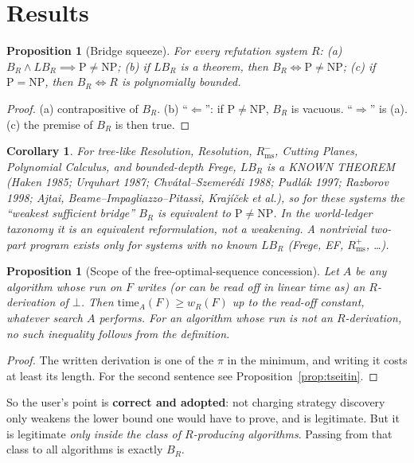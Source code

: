 \documentclass[11pt]{article}
\newtheorem{proposition}[theorem]{Proposition}
\newtheorem{corollary}[theorem]{Corollary}
\begin{document}
\section{Results}
\begin{proposition}[Bridge squeeze]\label{prop:squeeze}
For every refutation system $R$:
(a) $B_R\wedge LB_R\implies \mathrm P\ne\mathrm{NP}$;
(b) if $LB_R$ is a theorem, then $B_R\iff \mathrm P\ne\mathrm{NP}$;
(c) if $\mathrm P=\mathrm{NP}$, then $B_R\iff R$ is polynomially bounded.
\end{proposition}
\begin{proof}
(a) contrapositive of $B_R$. (b) ``$\Leftarrow$'': if $\mathrm P\neq\mathrm{NP}$, $B_R$ is vacuous.
``$\Rightarrow$'' is (a). (c) the premise of $B_R$ is then true.
\end{proof}
\begin{corollary}
For tree-like Resolution, Resolution, $R_{\mathrm{ms}}^{-}$, Cutting Planes, Polynomial Calculus,
and bounded-depth Frege, $LB_R$ is a KNOWN THEOREM (Haken 1985; Urquhart 1987; Chv\'atal--Szemer\'edi 1988;
Pudl\'ak 1997; Razborov 1998; Ajtai, Beame--Impagliazzo--Pitassi, Kraj\'i\v{c}ek et al.),
so for these systems the ``weakest sufficient bridge'' $B_R$ is \emph{equivalent to} $\mathrm P\neq\mathrm{NP}$.
In the world-ledger taxonomy it is an equivalent reformulation, not a weakening.
A nontrivial two-part program exists only for systems with no known $LB_R$ (Frege, EF, $R_{\mathrm{ms}}^{+}$, \dots).
\end{corollary}

\begin{proposition}[Scope of the free-optimal-sequence concession]\label{prop:free}
Let $A$ be any algorithm whose run on $F$ \emph{writes} (or can be read off in linear time as) an
$R$-derivation of $\bot$. Then $\mathrm{time}_A(F)\ge w_R(F)$ up to the read-off constant,
whatever search $A$ performs. For an algorithm whose run is not an $R$-derivation, no such inequality
follows from the definition.
\end{proposition}
\begin{proof}
The written derivation is one of the $\pi$ in the minimum, and writing it costs at least its length.
For the second sentence see Proposition~\ref{prop:tseitin}.
\end{proof}
So the user's point is \textbf{correct and adopted}: not charging strategy discovery only weakens the
lower bound one would have to prove, and is legitimate. But it is legitimate \emph{only inside the class
of $R$-producing algorithms}. Passing from that class to all algorithms is exactly $B_R$.
\end{document}

